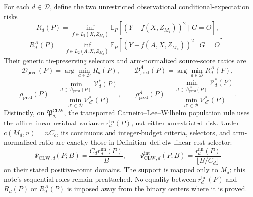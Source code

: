 For each \(d\in\mathcal D\), define the two unrestricted observational conditional-expectation risks
\[
R_d(P)=\inf_{f\in L_2(X,Z_{M_d})}
\mathbb E_P[(Y-f(X,Z_{M_d}))^2\mid G=O],
\]
\[
R_d^A(P)=\inf_{f\in L_2(A,X,Z_{M_d})}
\mathbb E_P[(Y-f(A,X,Z_{M_d}))^2\mid G=O].
\]
Their generic tie-preserving selectors and arm-normalized source-score ratios are
\[
\mathcal D_{\mathrm{pred}}(P)=\arg\min_{d\in\mathcal D}R_d(P),
\qquad
\mathcal D_{\mathrm{pred}}^A(P)=\arg\min_{d\in\mathcal D}R_d^A(P),
\]
\[
\rho_{\mathrm{pred}}(P)=
\frac{\min_{d\in\mathcal D_{\mathrm{pred}}(P)}\mathcal V_d^*(P)}
{\min_{d'\in\mathcal D}\mathcal V_{d'}^*(P)},
\qquad
\rho_{\mathrm{pred}}^A(P)=
\frac{\min_{d\in\mathcal D_{\mathrm{pred}}^A(P)}\mathcal V_d^*(P)}
{\min_{d'\in\mathcal D}\mathcal V_{d'}^*(P)}.
\]
Distinctly, on \(\mathfrak P_{\mathcal D}^{\mathrm{CLW}}\), the transported Carneiro--Lee--Wilhelm population rule uses the affine linear residual variance \(r_d^{\mathrm{lin}}(P)\), not either unrestricted risk.  Under \(c(M_d,n)=nC_d\), its continuous and integer-budget criteria, selectors, and arm-normalized ratio are exactly those in Definition~\(\mathrm{def{:}clw\text{-}linear\text{-}cost\text{-}selector}\):
\[
 \Psi_{\mathrm{CLW},d}(P;B)=\frac{C_dr_d^{\mathrm{lin}}(P)}{B},
 \qquad
 \Psi_{\mathrm{CLW},d}^{\mathrm{int}}(P;B)
 =\frac{r_d^{\mathrm{lin}}(P)}{\lfloor B/C_d\rfloor}
\]
on their stated positive-count domains.  The support is mapped only to \(M_d\); this note's sequential roles remain preattached.  No equality between \(r_d^{\mathrm{lin}}(P)\) and \(R_d(P)\) or \(R_d^A(P)\) is imposed away from the binary centers where it is proved.